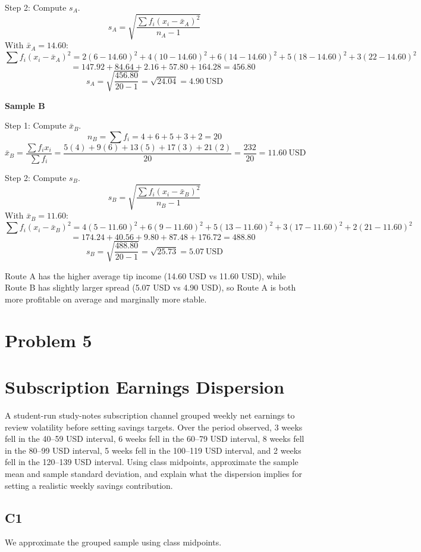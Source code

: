 \begin{ExamProblems}
		Step 2: Compute $s_A$.
		\[
		s_A = \sqrt{\frac{\sum f_i(x_i-\bar{x}_A)^2}{n_A-1}}
		\]
		With $\bar{x}_A=14.60$:
		\[
		\sum f_i(x_i-\bar{x}_A)^2 = 2(6-14.60)^2 + 4(10-14.60)^2 + 6(14-14.60)^2 + 5(18-14.60)^2 + 3(22-14.60)^2
		\]
		\[
		\qquad = 147.92 + 84.64 + 2.16 + 57.80 + 164.28 = 456.80
		\]
		\[
		s_A = \sqrt{\frac{456.80}{20-1}} = \sqrt{24.04} = 4.90\ \text{USD}
		\]

		\textbf{Sample B}

		Step 1: Compute $\bar{x}_B$.
		\[
		n_B = \sum f_i = 4+6+5+3+2 = 20
		\]
		\[
		\bar{x}_B = \frac{\sum f_i x_i}{\sum f_i}
		= \frac{5(4)+9(6)+13(5)+17(3)+21(2)}{20}
		= \frac{232}{20}
		= 11.60\ \text{USD}
		\]

		Step 2: Compute $s_B$.
		\[
		s_B = \sqrt{\frac{\sum f_i(x_i-\bar{x}_B)^2}{n_B-1}}
		\]
		With $\bar{x}_B=11.60$:
		\[
		\sum f_i(x_i-\bar{x}_B)^2 = 4(5-11.60)^2 + 6(9-11.60)^2 + 5(13-11.60)^2 + 3(17-11.60)^2 + 2(21-11.60)^2
		\]
		\[
		\qquad = 174.24 + 40.56 + 9.80 + 87.48 + 176.72 = 488.80
		\]
		\[
		s_B = \sqrt{\frac{488.80}{20-1}} = \sqrt{25.73} = 5.07\ \text{USD}
		\]

		Route A has the higher average tip income (14.60 USD vs 11.60 USD), while Route B has slightly larger spread (5.07 USD vs 4.90 USD), so Route A is both more profitable on average and marginally more stable.

		\newpage
		\item
		\section{Problem 5}
		\section{Subscription Earnings Dispersion}
		A student-run study-notes subscription channel grouped weekly net earnings to review volatility before setting savings targets. Over the period observed, 3 weeks fell in the 40--59 USD interval, 6 weeks fell in the 60--79 USD interval, 8 weeks fell in the 80--99 USD interval, 5 weeks fell in the 100--119 USD interval, and 2 weeks fell in the 120--139 USD interval. Using class midpoints, approximate the sample mean and sample standard deviation, and explain what the dispersion implies for setting a realistic weekly savings contribution.

		\subsection*{C1}
		We approximate the grouped sample using class midpoints.


\end{ExamProblems}
